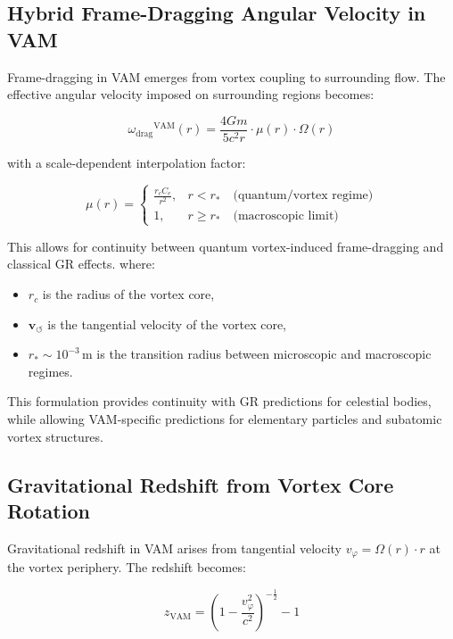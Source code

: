 \documentclass[preprint]{revtex4-2}
\begin{document}
\subsection*{Hybrid Frame-Dragging Angular Velocity in VAM}

Frame-dragging in VAM emerges from vortex coupling to surrounding flow. The effective angular velocity imposed on surrounding regions becomes:

\begin{equation}
    {\omega_{\text{drag}}}^{\text{VAM}}(r) =
    \frac{4 G m}{5 c^2 r} \cdot \mu(r) \cdot \Omega(r)
\end{equation}

\noindent with a scale-dependent interpolation factor:

\begin{equation}
    \mu(r) =
    \begin{cases}
        \frac{r_c C_e}{r^2}, & r < r_\ast \quad \text{(quantum/vortex regime)} \\
        1, & r \geq r_\ast \quad \text{(macroscopic limit)}
    \end{cases}
\end{equation}

This allows for continuity between quantum vortex-induced frame-dragging and classical GR effects.
where:
\begin{itemize}
    \item \( r_c \) is the radius of the vortex core,
    \item \( \mathbf{v}_{\scriptscriptstyle\boldsymbol{\circlearrowleft}} \) is the tangential velocity of the vortex core,
    \item \( r_\ast \sim 10^{-3} \, \text{m} \) is the transition radius between microscopic and macroscopic regimes.
\end{itemize}

This formulation provides continuity with GR predictions for celestial bodies, while allowing VAM-specific predictions for elementary particles and subatomic vortex structures.

\subsection*{Gravitational Redshift from Vortex Core Rotation}

Gravitational redshift in VAM arises from tangential velocity \( v_\varphi = \Omega(r) \cdot r \) at the vortex periphery. The redshift becomes:

\begin{equation}
    z_\text{VAM} = \left( 1 - \frac{v_\varphi^2}{c^2} \right)^{-\frac{1}{2}} - 1
\end{equation}
\end{document}
